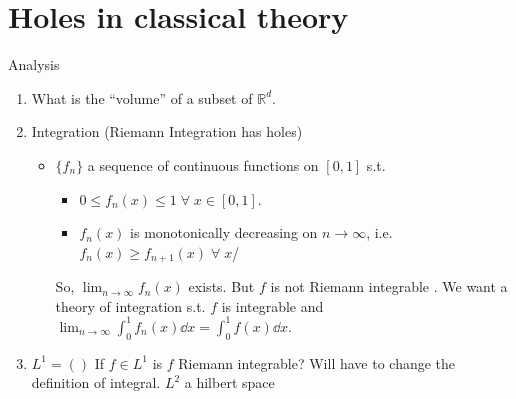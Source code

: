 
\def\npart {II}
\def\nterm {Michaelmas}
\def\nyear {2023}
\def\nlecturer {Dr Sarkar}
\def\ncourse {Probability and Measure}


\usepackage{relsize}

\newcommand{\symmdiff}{\mathrel{\raisebox{1pt}{$\mathsmaller\triangle$}}}
\newcommand{\prob}[1]{\mathbb{P}\left({#1}\right)}
\let \emptyset \varnothing
\newcommand{\expect}[1]{\mathbb{E}\left[{#1}\right]}
\DeclarePairedDelimiter\floor{\lfloor}{\rfloor}
\newcommand{\wildcard}{{}\cdot{}}
\DeclareMathOperator*{\esssup}{ess\ sup}
\newcommand{\hhat}[1]{\hat{\hat{#1}}}
\newcommand{\midd}{\,\middle|\,}

% 

\setcounter{section}{-1}


    \maketitle
    \tableofcontents

    \section{Holes in classical theory}

    Analysis

    \begin{enumerate}
        \item What is the ``volume'' of a subset of $\mathbb{R}^d$.
        \item Integration (Riemann Integration has holes)
        \begin{itemize}
            \item $\{f_n\}$ a sequence of continuous functions on $[0, 1]$ s.t.
            \begin{itemize}
                \item $0 \leq f_n(x) \leq 1 \; \forall \; x \in [0, 1]$.
                \item $f_n(x)$ is monotonically decreasing on $n \to \infty$, i.e. $f_n(x) \geq f_{n+1}(x) \; \forall \; x$/
            \end{itemize}
            So, $\lim_{n \to \infty} f_n(x)$ exists. But $f$ is not Riemann integrable . We want a theory of integration s.t. $f$ is integrable and $\lim_{n \to \infty} \int_{0}^{1} f_n(x) \dd{x} = \int_{0}^{1} f(x) \dd{x}$.
        \end{itemize}
        \item $L^1 = ()$
        If $f \in L^1$ is $f$ Riemann integrable? Will have to change the definition of integral. $L^2$ a hilbert space
    \end{enumerate}

